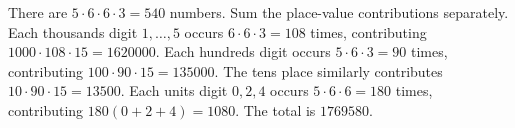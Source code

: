 There are $5\cdot6\cdot6\cdot3=540$ numbers. Sum the place-value contributions separately.
Each thousands digit $1,\ldots,5$ occurs $6\cdot6\cdot3=108$ times, contributing $1000\cdot108\cdot15=1620000$.
Each hundreds digit occurs $5\cdot6\cdot3=90$ times, contributing $100\cdot90\cdot15=135000$.
The tens place similarly contributes $10\cdot90\cdot15=13500$.
Each units digit $0,2,4$ occurs $5\cdot6\cdot6=180$ times, contributing $180(0+2+4)=1080$.
The total is $\boxed{1769580}$.
